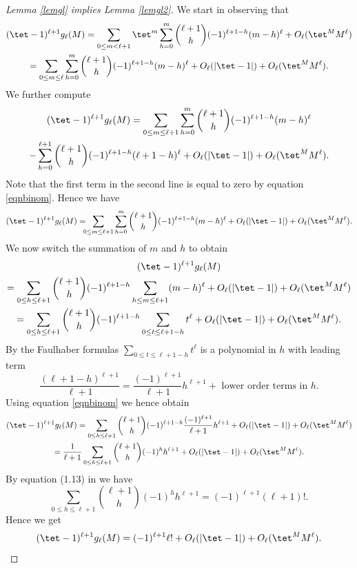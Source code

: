 \begin{proof}[Lemma \ref{lemgl} implies Lemma \ref{lemgl2}]
We start in observing that
\begin{multline*}
(\tet -1)^{\ell+1}g_\ell(M)= \sum_{0\leq m<\ell+1}\tet^m \sum_{h=0}^m \binom{\ell+1}{h}(-1)^{\ell+1-h}(m-h)^\ell
+O_\ell (\tet^M M^\ell)\\
= \sum_{0\leq m\leq \ell} \sum_{h=0}^m \binom{\ell+1}{h}(-1)^{\ell+1-h}(m-h)^\ell 
+O_\ell(|\tet-1|)+O_{\ell}(\tet^M M^{\ell}).
\end{multline*}
We further compute
\begin{multline*}
(\tet -1)^{\ell+1}g_\ell(M)= \sum_{0\leq m\leq \ell+1} \sum_{h=0}^m \binom{\ell+1}{h}(-1)^{\ell+1-h}(m-h)^\ell \\
- \sum_{h=0}^{\ell+1} \binom{\ell+1}{h}(-1)^{\ell+1-h}(\ell+1-h)^\ell +O_\ell(|\tet-1|)+O_\ell (\tet^M M^\ell).
\end{multline*}
Note that the first term in the second line is equal to zero by equation \eqref{eqnbinom}. Hence we have
\[
(\tet -1)^{\ell+1}g_\ell(M)=\hspace*{-2mm} \sum_{0\leq m\leq \ell+1} \sum_{h=0}^m \binom{\ell+1}{h}(-1)^{\ell+1-h}(m-h)^\ell
+O_\ell(|\tet-1|)+O_\ell (\tet^M M^\ell).
\]
We now switch the summation of $m$ and $h$ to obtain
\begin{multline*}
(\tet -1)^{\ell+1}g_\ell(M)\\
= \sum_{0\leq h\leq \ell+1} \binom{\ell+1}{h}(-1)^{\ell+1-h}\sum_{h\leq m\leq \ell+1} (m-h)^\ell 
+O_\ell(|\tet-1|)+O_\ell (\tet^M M^\ell)\\
= \sum_{0\leq h\leq \ell+1} \binom{\ell+1}{h}(-1)^{\ell+1-h}\sum_{0\leq t\leq \ell+1-h} t^\ell +O_\ell(|\tet-1|)+O_\ell(\tet^M M^\ell).
\end{multline*}
By the Faulhaber formulas $\sum_{0\leq t\leq \ell+1-h} t^\ell$ is a polynomial in $h$ with leading term
\[
\frac{(\ell+1-h)^{\ell+1}}{\ell+1} = \frac{(-1)^{\ell+1}}{\ell+1}h^{\ell+1} + \mbox{ lower order terms in } h.
\]
Using equation \eqref{eqnbinom} we hence obtain
\begin{multline*}
(\tet -1)^{\ell+1}g_\ell(M)= \sum_{0\leq h\leq \ell+1} \binom{\ell+1}{h}(-1)^{\ell+1-h} \frac{(-1)^{\ell+1}}{\ell+1}h^{\ell+1}+O_\ell(|\tet-1|)+O_\ell (\tet^M M^\ell)\\
= \frac{1}{\ell+1}\sum_{0\leq h\leq \ell+1} \binom{\ell+1}{h}(-1)^{h} h^{\ell+1}+O_\ell(|\tet-1|)+O_\ell(\tet^M M^\ell).
\end{multline*}
By equation (1.13) in \cite{Gould} we have
\[
\sum_{0\leq h\leq \ell+1} \binom{\ell+1}{h}(-1)^{h} h^{\ell+1} = (-1)^{\ell+1} (\ell+1)!.
\]
Hence we get
\[
(\tet -1)^{\ell+1}g_\ell(M)=(-1)^{\ell+1} \ell! +O_\ell(|\tet-1|)+O_\ell (\tet^M M^\ell). \qedhere
\]
\end{proof}

